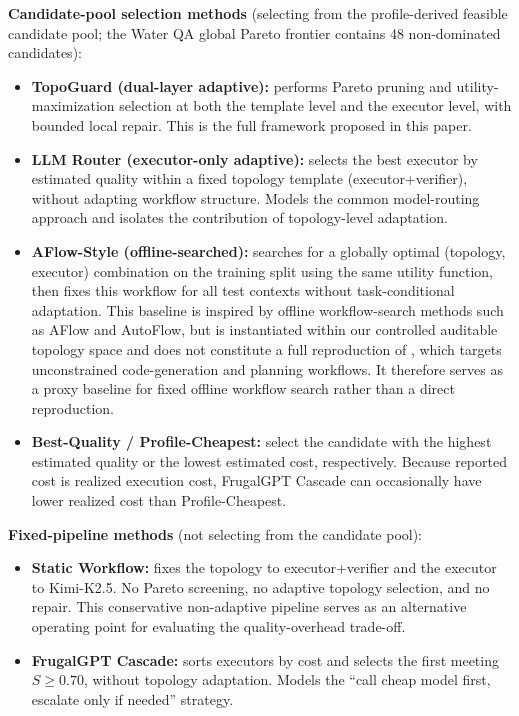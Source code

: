 \documentclass[acmsmall,review,anonymous]{acmart}
\begin{document}
\textbf{Candidate-pool selection methods} (selecting from the profile-derived feasible candidate pool; the Water QA global Pareto frontier contains 48 non-dominated candidates):
\begin{itemize}
    \item \textbf{TopoGuard (dual-layer adaptive):} performs Pareto pruning and utility-maximization selection at both the template level and the executor level, with bounded local repair. This is the full framework proposed in this paper.
    \item \textbf{LLM Router (executor-only adaptive):} selects the best executor by estimated quality within a fixed topology template (executor+verifier), without adapting workflow structure. Models the common model-routing approach and isolates the contribution of topology-level adaptation.
    \item \textbf{AFlow-Style (offline-searched):} searches for a globally optimal (topology, executor) combination on the training split using the same utility function, then fixes this workflow for all test contexts without task-conditional adaptation. This baseline is inspired by offline workflow-search methods such as AFlow and AutoFlow, but is instantiated within our controlled auditable topology space and does not constitute a full reproduction of \cite{zhang2024aflow}, which targets unconstrained code-generation and planning workflows. It therefore serves as a proxy baseline for fixed offline workflow search rather than a direct reproduction.
    \item \textbf{Best-Quality / Profile-Cheapest:} select the candidate with the highest estimated quality or the lowest estimated cost, respectively. Because reported cost is realized execution cost, FrugalGPT Cascade can occasionally have lower realized cost than Profile-Cheapest.
\end{itemize}

\textbf{Fixed-pipeline methods} (not selecting from the candidate pool):
\begin{itemize}
    \item \textbf{Static Workflow:} fixes the topology to executor+verifier and the executor to Kimi-K2.5. No Pareto screening, no adaptive topology selection, and no repair. This conservative non-adaptive pipeline serves as an alternative operating point for evaluating the quality-overhead trade-off.
    \item \textbf{FrugalGPT Cascade:} sorts executors by cost and selects the first meeting $S \geq 0.70$, without topology adaptation. Models the ``call cheap model first, escalate only if needed'' strategy.
\end{itemize}
\end{document}

